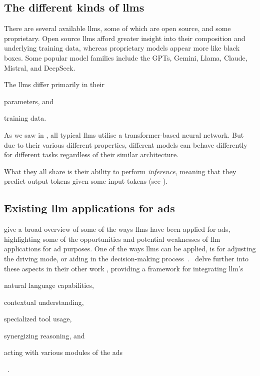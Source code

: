 \subsection{The different kinds of \acrshort{llms}}\label{sec:llmJungle}

There are several available \acrshort{llms}, some of which are open source, and some proprietary.
Open source \acrshort{llms} afford greater insight into their composition and underlying training
data, whereas proprietary models appear more like black boxes. Some popular model families include
the GPTs, Gemini, Llama, Claude, Mistral, and DeepSeek.

The \acrshort{llms} differ primarily in their \begin{inparaenum}
    \item parameters, and
    \item training data.
\end{inparaenum}
As we saw in , all typical \acrshort{llms} utilise a transformer-based neural
network. But due to their various different properties, different models can behave differently for
different tasks regardless of their similar architecture.

What they all share is their ability to perform \textit{inference}, meaning that they predict output
tokens given some input tokens (see ).

\subsection{Existing \acrshort{llm} applications for \acrshort{ads}}\label{sec:llmsForAds}


\citeauthor{LLM4AD} give a broad overview of some of the ways \acrshort{llms} have been applied for
\acrshort{ads}, highlighting some of the opportunities and potential weaknesses of \acrshort{llm}
applications for \acrshort{ad} purposes. One of the ways \acrshort{llms} can be applied, is for
adjusting the driving mode, or aiding in the decision-making
process~\cite[1]{LLM4AD}.~\citeauthor{driveAsYouSpeak} delve further into these aspects in their
other work , providing a framework for integrating \acrlong{llm}'s
\begin{inparaenum}
    \item natural language capabilities,
    \item contextual understanding,
    \item specialized tool usage,
    \item synergizing reasoning, and
    \item acting with various modules of the \acrshort{ads}
\end{inparaenum}~\cite[1]{driveAsYouSpeak}.
